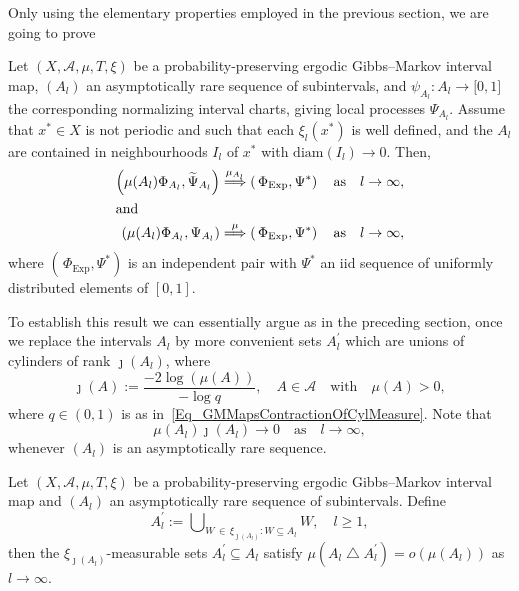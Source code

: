 \documentclass[AHL,Unicode,longabstracts]{cedram}
\newcommand{\clA}{\mathcal{A}}
\newcommand{\Expl}{\mathrm{Exp}}
\newcommand{\diam}{\mathrm{diam}}
\begin{document}
Only using the elementary properties employed in the previous section, we are going to prove

\begin{theo}\label{T_WhenWhereGMIntervalMaps}
Let $(X,\clA,\mu,T,\xi)$ be a probability-preserving ergodic Gibbs--Markov interval map, $(A_{l})$ an asymptotically rare sequence of subintervals, and $\psi_{A_{l}}:A_{l}
\rightarrow\lbrack0,1]$ the corresponding normalizing interval charts, giving local processes $\Psi_{A_{l}}$. Assume that $x^{\ast}\in X$ is not periodic and such that each $\xi_{l}(x^{\ast})$ is well defined, and the $A_{l}$ are contained in neighbourhoods $I_{l}$ of $x^{\ast}$ with $\diam (I_{l})\rightarrow0$. Then,
\begin{align}
\left(\mu(A_{l})\Phi_{A_{l}},\widetilde{\Psi}_{A_{l}}\right)&\overset{\mu_{A_{l}} }{\Longrightarrow}\left(\,\Phi_{\Expl},\Psi^{\ast}\right)\quad\text{as}\quad l\rightarrow\infty,
\\
\intertext{and}
\left(\mu(A_{l})\Phi_{A_{l}},\Psi_{A_{l}}\right) &\overset{\mu}{\Longrightarrow} \left(\,\Phi_{\Expl},\Psi^{\ast}\right)\quad\text{as}\quad l\rightarrow\infty,
\end{align}
where $(\,\Phi_{\Expl},\Psi^{\ast})$ is an independent pair with $\Psi^{\ast}$ an iid sequence of uniformly distributed elements of $[0,1]$.
\end{theo}

To establish this result we can essentially argue as in the preceding section, once we replace the intervals $A_{l}$ by more convenient sets $A_{l}^{\prime}$ which are unions of cylinders of rank $\jmath(A_{l})$, where
\begin{equation}\label{Eq_DefRankFunctionJ}
\jmath(A):=\frac{-2\log(\mu(A))}{-\log q}, \quad A\in\clA\quad\text{with}\quad \mu(A)>0, 
\end{equation}
where $q\in(0,1)$ is as in~\eqref{Eq_GMMapsContractionOfCylMeasure}. Note that
\begin{equation}\label{Eq_mkhmnzknmznmznmz}
\mu(A_{l})\jmath(A_{l})\longrightarrow0 \quad\text{as} \quad l\rightarrow
\infty, 
\end{equation}
whenever $(A_{l})$ is an asymptotically rare sequence.

\begin{lemm}\label{L_ApproxByCyls}
Let $(X,\clA,\mu,T,\xi)$ be a probability-preserving ergodic Gibbs--Markov interval map and $(A_{l})$ an asymptotically rare sequence of subintervals. Define
\begin{equation}
A_{l}^{\prime}:= {\textstyle\bigcup\nolimits_{W\,\in\,\xi_{\jmath(A_{l})}:W\subseteq A_{l}}} W, \quad l\geq1,
\end{equation}
then the $\xi_{\jmath(A_{l})}$-measurable sets $A_{l}^{\prime}\subseteq A_{l}$ satisfy $\mu(A_{l}\bigtriangleup A_{l}^{\prime})=o(\mu(A_{l}))$ as $l\rightarrow\infty$.
\end{lemm}
\end{document}
